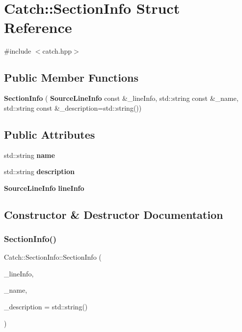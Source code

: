 \section{Catch\+:\+:Section\+Info Struct Reference}
\label{struct_catch_1_1_section_info}


{\ttfamily \#include $<$catch.\+hpp$>$}

\subsection*{Public Member Functions}
\begin{DoxyCompactItemize}
\item 
\textbf{ Section\+Info} (\textbf{ Source\+Line\+Info} const \&\+\_\+line\+Info, std\+::string const \&\+\_\+name, std\+::string const \&\+\_\+description=std\+::string())
\end{DoxyCompactItemize}
\subsection*{Public Attributes}
\begin{DoxyCompactItemize}
\item 
std\+::string \textbf{ name}
\item 
std\+::string \textbf{ description}
\item 
\textbf{ Source\+Line\+Info} \textbf{ line\+Info}
\end{DoxyCompactItemize}


\subsection{Constructor \& Destructor Documentation}
\mbox{\label{struct_catch_1_1_section_info_a27aff3aaf8b6611f3651b17111a272c6}} 
\subsubsection{Section\+Info()}
{\footnotesize\ttfamily Catch\+::\+Section\+Info\+::\+Section\+Info (\begin{DoxyParamCaption}\item[{\textbf{ Source\+Line\+Info} const \&}]{\+\_\+line\+Info,  }\item[{std\+::string const \&}]{\+\_\+name,  }\item[{std\+::string const \&}]{\+\_\+description = {\ttfamily std\+:\+:string()} }\end{DoxyParamCaption})}



